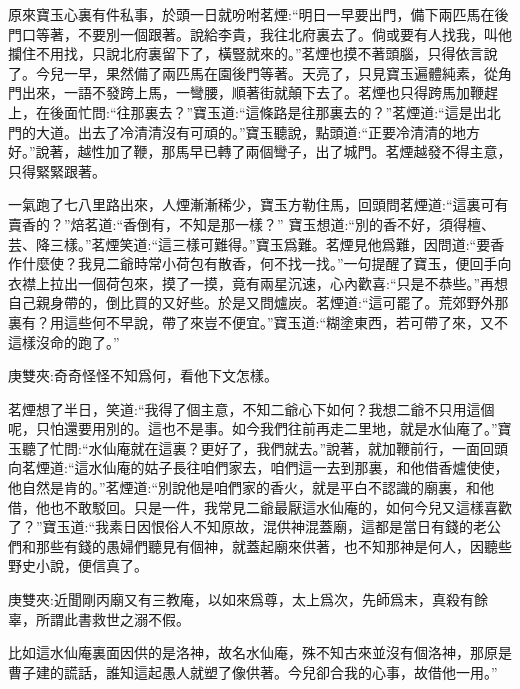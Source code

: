 \begin{parag}
    原來寶玉心裏有件私事，於頭一日就吩咐茗煙:“明日一早要出門，備下兩匹馬在後門口等著，不要別一個跟著。說給李貴，我往北府裏去了。倘或要有人找我，叫他攔住不用找，只說北府裏留下了，橫豎就來的。”茗煙也摸不著頭腦，只得依言說了。今兒一早，果然備了兩匹馬在園後門等著。天亮了，只見寶玉遍體純素，從角門出來，一語不發跨上馬，一彎腰，順著街就顛下去了。茗煙也只得跨馬加鞭趕上，在後面忙問:“往那裏去？”寶玉道:“這條路是往那裏去的？”茗煙道:“這是出北門的大道。出去了冷清清沒有可頑的。”寶玉聽說，點頭道:“正要冷清清的地方好。”說著，越性加了鞭，那馬早已轉了兩個彎子，出了城門。茗煙越發不得主意，只得緊緊跟著。
\end{parag}


\begin{parag}
    一氣跑了七八里路出來，人煙漸漸稀少，寶玉方勒住馬，回頭問茗煙道:“這裏可有賣香的？”焙茗道:“香倒有，不知是那一樣？” 寶玉想道:“別的香不好，須得檀、芸、降三樣。”茗煙笑道:“這三樣可難得。”寶玉爲難。茗煙見他爲難，因問道:“要香作什麼使？我見二爺時常小荷包有散香，何不找一找。”一句提醒了寶玉，便回手向衣襟上拉出一個荷包來，摸了一摸，竟有兩星沉速，心內歡喜:“只是不恭些。”再想自己親身帶的，倒比買的又好些。於是又問爐炭。茗煙道:“這可罷了。荒郊野外那裏有？用這些何不早說，帶了來豈不便宜。”寶玉道:“糊塗東西，若可帶了來，又不這樣沒命的跑了。”\begin{note}庚雙夾:奇奇怪怪不知爲何，看他下文怎樣。\end{note}茗煙想了半日，笑道:“我得了個主意，不知二爺心下如何？我想二爺不只用這個呢，只怕還要用別的。這也不是事。如今我們往前再走二里地，就是水仙庵了。”寶玉聽了忙問:“水仙庵就在這裏？更好了，我們就去。”說著，就加鞭前行，一面回頭向茗煙道:“這水仙庵的姑子長往咱們家去，咱們這一去到那裏，和他借香爐使使，他自然是肯的。”茗煙道:“別說他是咱們家的香火，就是平白不認識的廟裏，和他借，他也不敢駁回。只是一件，我常見二爺最厭這水仙庵的，如何今兒又這樣喜歡了？”寶玉道:“我素日因恨俗人不知原故，混供神混蓋廟，這都是當日有錢的老公們和那些有錢的愚婦們聽見有個神，就蓋起廟來供著，也不知那神是何人，因聽些野史小說，便信真了。\begin{note}庚雙夾:近聞剛丙廟又有三教庵，以如來爲尊，太上爲次，先師爲末，真殺有餘辜，所謂此書救世之溺不假。\end{note}比如這水仙庵裏面因供的是洛神，故名水仙庵，殊不知古來並沒有個洛神，那原是曹子建的謊話，誰知這起愚人就塑了像供著。今兒卻合我的心事，故借他一用。”
\end{parag}


